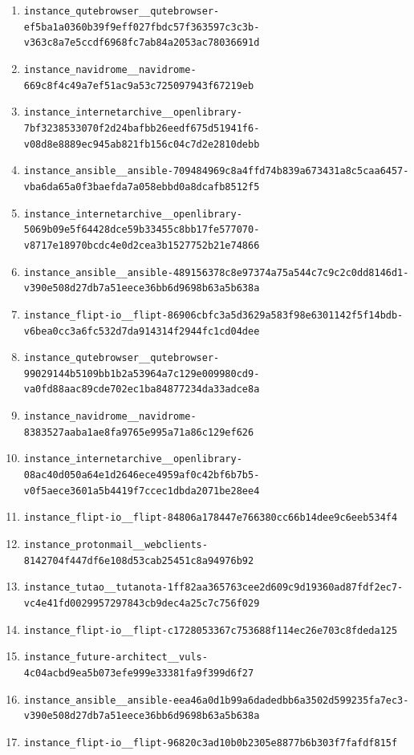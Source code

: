 \documentclass{llmxive}
\begin{document}
\begin{enumerate}
\item \texttt{instance\_qutebrowser\_\_qutebrowser-ef5ba1a0360b39f9eff027fbdc57f363597c3c3b-v363c8a7e5ccdf6968fc7ab84a2053ac78036691d}
\item \texttt{instance\_navidrome\_\_navidrome-669c8f4c49a7ef51ac9a53c725097943f67219eb}
\item \texttt{instance\_internetarchive\_\_openlibrary-7bf3238533070f2d24bafbb26eedf675d51941f6-v08d8e8889ec945ab821fb156c04c7d2e2810debb}
\item \texttt{instance\_ansible\_\_ansible-709484969c8a4ffd74b839a673431a8c5caa6457-vba6da65a0f3baefda7a058ebbd0a8dcafb8512f5}
\item \texttt{instance\_internetarchive\_\_openlibrary-5069b09e5f64428dce59b33455c8bb17fe577070-v8717e18970bcdc4e0d2cea3b1527752b21e74866}
\item \texttt{instance\_ansible\_\_ansible-489156378c8e97374a75a544c7c9c2c0dd8146d1-v390e508d27db7a51eece36bb6d9698b63a5b638a}
\item \texttt{instance\_flipt-io\_\_flipt-86906cbfc3a5d3629a583f98e6301142f5f14bdb-v6bea0cc3a6fc532d7da914314f2944fc1cd04dee}
\item \texttt{instance\_qutebrowser\_\_qutebrowser-99029144b5109bb1b2a53964a7c129e009980cd9-va0fd88aac89cde702ec1ba84877234da33adce8a}
\item \texttt{instance\_navidrome\_\_navidrome-8383527aaba1ae8fa9765e995a71a86c129ef626}
\item \texttt{instance\_internetarchive\_\_openlibrary-08ac40d050a64e1d2646ece4959af0c42bf6b7b5-v0f5aece3601a5b4419f7ccec1dbda2071be28ee4}
\item \texttt{instance\_flipt-io\_\_flipt-84806a178447e766380cc66b14dee9c6eeb534f4}
\item \texttt{instance\_protonmail\_\_webclients-8142704f447df6e108d53cab25451c8a94976b92}
\item \texttt{instance\_tutao\_\_tutanota-1ff82aa365763cee2d609c9d19360ad87fdf2ec7-vc4e41fd0029957297843cb9dec4a25c7c756f029}
\item \texttt{instance\_flipt-io\_\_flipt-c1728053367c753688f114ec26e703c8fdeda125}
\item \texttt{instance\_future-architect\_\_vuls-4c04acbd9ea5b073efe999e33381fa9f399d6f27}
\item \texttt{instance\_ansible\_\_ansible-eea46a0d1b99a6dadedbb6a3502d599235fa7ec3-v390e508d27db7a51eece36bb6d9698b63a5b638a}
\item \texttt{instance\_flipt-io\_\_flipt-96820c3ad10b0b2305e8877b6b303f7fafdf815f}

\end{enumerate}
\end{document}
